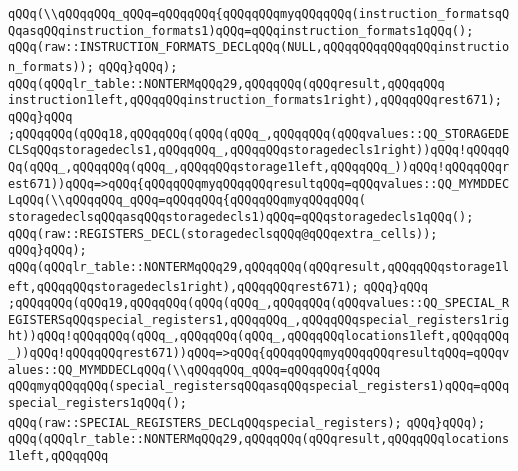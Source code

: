 \verb|qQQq(\\qQQqqQQq_qQQq=qQQqqQQq{qQQqqQQqmyqQQqqQQq(instruction_formatsqQQqasqQQqinstruction_formats1)qQQq=qQQqinstruction_formats1qQQq();|\newline
\verb|qQQq(raw::INSTRUCTION_FORMATS_DECLqQQq(NULL,qQQqqQQqqQQqqQQqinstruction_formats));|\newline
\verb|qQQq}qQQq);|\newline
\verb|qQQq(qQQqlr_table::NONTERMqQQq29,qQQqqQQq(qQQqresult,qQQqqQQq|\newline
\verb|instruction1left,qQQqqQQqinstruction_formats1right),qQQqqQQqrest671);|\newline
\verb|qQQq}qQQq|\newline
\verb|;qQQqqQQq(qQQq18,qQQqqQQq(qQQq(qQQq_,qQQqqQQq(qQQqvalues::QQ_STORAGEDECLSqQQqstoragedecls1,qQQqqQQq_,qQQqqQQqstoragedecls1right))qQQq!qQQqqQQq(qQQq_,qQQqqQQq(qQQq_,qQQqqQQqstorage1left,qQQqqQQq_))qQQq!qQQqqQQqrest671))qQQq=>qQQq{qQQqqQQqmyqQQqqQQqresultqQQq=qQQqvalues::QQ_MYMDDECLqQQq(\\qQQqqQQq_qQQq=qQQqqQQq{qQQqqQQqmyqQQqqQQq(|\newline
\verb|storagedeclsqQQqasqQQqstoragedecls1)qQQq=qQQqstoragedecls1qQQq();|\newline
\verb|qQQq(raw::REGISTERS_DECL(storagedeclsqQQq@qQQqextra_cells));|\newline
\verb|qQQq}qQQq);|\newline
\verb|qQQq(qQQqlr_table::NONTERMqQQq29,qQQqqQQq(qQQqresult,qQQqqQQqstorage1left,qQQqqQQqstoragedecls1right),qQQqqQQqrest671);|\newline
\verb|qQQq}qQQq|\newline
\verb|;qQQqqQQq(qQQq19,qQQqqQQq(qQQq(qQQq_,qQQqqQQq(qQQqvalues::QQ_SPECIAL_REGISTERSqQQqspecial_registers1,qQQqqQQq_,qQQqqQQqspecial_registers1right))qQQq!qQQqqQQq(qQQq_,qQQqqQQq(qQQq_,qQQqqQQqlocations1left,qQQqqQQq_))qQQq!qQQqqQQqrest671))qQQq=>qQQq{qQQqqQQqmyqQQqqQQqresultqQQq=qQQqvalues::QQ_MYMDDECLqQQq(\\qQQqqQQq_qQQq=qQQqqQQq{qQQq|\newline
\verb|qQQqmyqQQqqQQq(special_registersqQQqasqQQqspecial_registers1)qQQq=qQQqspecial_registers1qQQq();|\newline
\verb|qQQq(raw::SPECIAL_REGISTERS_DECLqQQqspecial_registers);|\newline
\verb|qQQq}qQQq);|\newline
\verb|qQQq(qQQqlr_table::NONTERMqQQq29,qQQqqQQq(qQQqresult,qQQqqQQqlocations1left,qQQqqQQq|\newline

